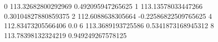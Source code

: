 0 113.32682800292969 0.492095947265625
1 113.13578033447266 0.30104827880859375
2 112.6088638305664 -0.22586822509765625
4 112.83473205566406 0.0
6 113.3689193725586 0.5341873168945312
8 113.78398132324219 0.949249267578125
